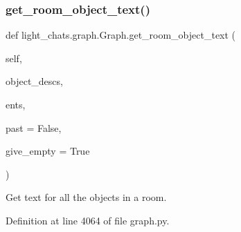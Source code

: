 \subsubsection{\texorpdfstring{get\+\_\+room\+\_\+object\+\_\+text()}{get\_room\_object\_text()}}
{\footnotesize\ttfamily def light\+\_\+chats.\+graph.\+Graph.\+get\+\_\+room\+\_\+object\+\_\+text (\begin{DoxyParamCaption}\item[{}]{self,  }\item[{}]{object\+\_\+descs,  }\item[{}]{ents,  }\item[{}]{past = {\ttfamily False},  }\item[{}]{give\+\_\+empty = {\ttfamily True} }\end{DoxyParamCaption})}

\begin{DoxyVerb}Get text for all the objects in a room.
\end{DoxyVerb}
 

Definition at line 4064 of file graph.\+py.



